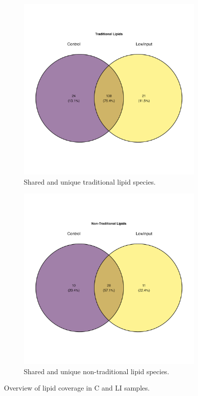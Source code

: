 \documentclass[10pt,letterpaper]{article}
\begin{document}
\begin{figure}[htp]
  \begin{subfigure}[t]{0.48\textwidth}
    \includegraphics[width=\linewidth]{fig/supp/SuppFig_3C_Lipid_Overlap_Venn_traditional.png}
    \caption{Shared and unique traditional lipid species.}
    \label{fig:S3C}
  \end{subfigure}\hfill
  \begin{subfigure}[t]{0.48\textwidth}
    \includegraphics[width=\linewidth]{fig/supp/SuppFig_3D_Lipid_Overlap_Venn_nontraditional.png}
    \caption{Shared and unique non-traditional lipid species.}
    \label{fig:S3D}
  \end{subfigure}

  \caption{Overview of lipid coverage in C and LI samples.}
  \label{fig:S3}
\end{figure}
\end{document}
